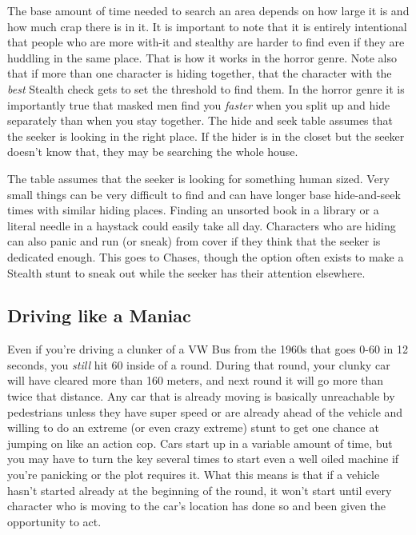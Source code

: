 The base amount of time needed to search an area depends on how large it is and how much crap there is in it. It is important to note that it is entirely intentional that people who are more with-it and stealthy are harder to find even if they are huddling in the same place. That is how it works in the horror genre. Note also that if more than one character is hiding together, that the character with the \textit{best} Stealth check gets to set the threshold to find them. In the horror genre it is importantly true that masked men find you \textit{faster} when you split up and hide separately than when you stay together. The hide and seek table assumes that the seeker is looking in the right place. If the hider is in the closet but the seeker doesn't know that, they may be searching the whole house.

The table assumes that the seeker is looking for something human sized. Very small things can be very difficult to find and can have longer base hide-and-seek times with similar hiding places. Finding an unsorted book in a library or a literal needle in a haystack could easily take all day. Characters who are hiding can also panic and run (or sneak) from cover if they think that the seeker is dedicated enough. This goes to Chases, though the option often exists to make a Stealth stunt to sneak out while the seeker has their attention elsewhere.

\subsection{Driving like a Maniac} 

\hspace{\parindent} Even if you're driving a clunker of a VW Bus from the 1960s that goes 0-60 in 12 seconds, you \textit{still} hit 60 inside of a round. During that round, your clunky car will have cleared more than 160 meters, and next round it will go more than twice that distance. Any car that is already moving is basically unreachable by pedestrians unless they have super speed or are already ahead of the vehicle and willing to do an extreme (or even crazy extreme) stunt to get one chance at jumping on like an action cop. Cars start up in a variable amount of time, but you may have to turn the key several times to start even a well oiled machine if you're panicking or the plot requires it. What this means is that if a vehicle hasn't started already at the beginning of the round, it won't start until every character who is moving to the car's location has done so and been given the opportunity to act.

